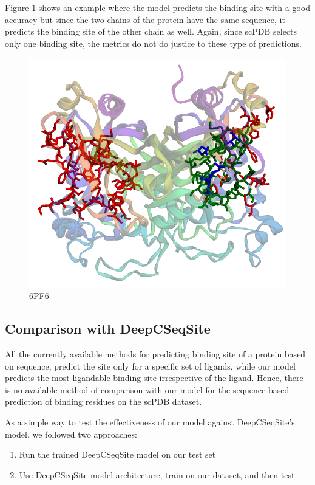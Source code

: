 \documentclass[journal=jacsat,manuscript=article]{achemso}
\begin{document}
Figure \ref{fig:6pf6} shows an example where the model predicts the binding site with a good accuracy but since the two chains of the protein have the same sequence, it predicts the binding site of the other chain as well. Again, since scPDB selects only one binding site, the metrics do not do justice to these type of predictions.
\begin{figure}
    \centering
    \noindent\includegraphics[scale=0.4]{6pf6.png}
    \caption{\centering 6PF6}
    \label{fig:6pf6}
\end{figure}

\subsection{Comparison with DeepCSeqSite}
All the currently available methods for predicting binding site of a protein based on sequence, predict the site only for a specific set of ligands, while our model predicts the most ligandable binding site irrespective of the ligand. Hence, there is no available method of comparison with our model for the sequence-based prediction of binding residues on the scPDB dataset.

As a simple way to test the effectiveness of our model against DeepCSeqSite's model, we followed two approaches:
\begin{enumerate}
    \item Run the trained DeepCSeqSite model on our test set
    \item Use DeepCSeqSite model architecture, train on our dataset, and then test
\end{enumerate}
\end{document}
